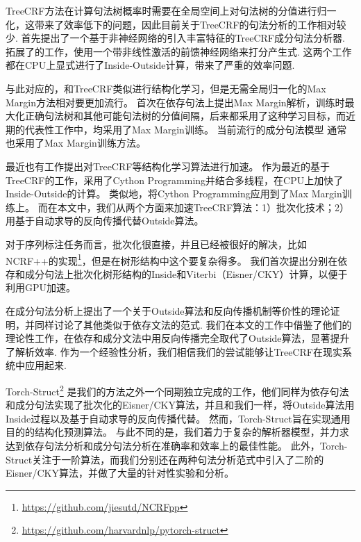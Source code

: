 TreeCRF方法在计算句法树概率时需要在全局空间上对句法树的分值进行归一化，这带来了效率低下的问题，因此目前关于TreeCRF的句法分析的工作相对较少.
\citet{finkel-etal-2008-efficient}首先提出了一个基于非神经网络的引入丰富特征的TreeCRF成分句法分析器.
\citet{durrett-klein-2015-neural}拓展了\citet{finkel-etal-2008-efficient}的工作，使用一个带非线性激活的前馈神经网络来打分产生式.
这两个工作都在CPU上显式进行了Inside-Outside计算，带来了严重的效率问题.

与此对应的，和TreeCRF类似进行结构化学习，但是无需全局归一化的Max Margin方法相对要更加流行。
\citet{taskar-etal-2004-max}首次在依存句法上提出Max Margin解析，训练时最大化正确句法树和其他可能句法树的分值间隔，后来\citet{mcdonald-etal-2005-online,mcdonald-etal-2005-online}都采用了这种学习目标，而近期的代表性工作中，\citet{wang-chang-2016-graph,kiperwasser-goldberg-2016-simple}均采用了Max Margin训练。
当前流行的成分句法模型 \citep{stern-etal-2017-minimal,kitaev-klein-2018-constituency,zhou-zhao-2019-head}通常也采用了Max Margin训练方法。

最近也有工作提出对TreeCRF等结构化学习算法进行加速。
\citet{zhang-etal-2017-dependency-parsing,jiang-etal-2018-supervised,li-etal-2019-semi-supervised}作为最近的基于TreeCRF的工作，采用了Cython Programming并结合多线程，在CPU上加快了Inside-Outside的计算。
类似地，\citet{kitaev-klein-2018-constituency}将Cython Programming应用到了Max Margin训练上。
而在本文中，我们从两个方面来加速TreeCRF算法：1）批次化技术；2）用基于自动求导的反向传播代替Outside算法。

对于序列标注任务而言，批次化很直接，并且已经被很好的解决，比如NCRF++的实现\footnote{\url{https://github.com/jiesutd/NCRFpp}}，但是在树形结构中这个要复杂得多。
我们首次提出分别在依存和成分句法上批次化树形结构的Inside和Viterbi（Eisner/CKY）计算，以便于利用GPU加速。

\citet{eisner-2016-inside}在成分句法分析上提出了一个关于Outside算法和反向传播机制等价性的理论证明，并同样讨论了其他类似于依存文法的范式.
我们在本文的工作中借鉴了他们的理论性工作，在依存和成分文法中用反向传播完全取代了Outside算法，显著提升了解析效率.
作为一个经验性分析，我们相信我们的尝试能够让TreeCRF在现实系统中应用起来.

Torch-Struct\footnote{\url{https://github.com/harvardnlp/pytorch-struct}} \citep{rush-2020-torch}是我们的方法之外一个同期独立完成的工作，他们同样为依存句法和成分句法实现了批次化的Eisner/CKY算法，并且和我们一样，将Outside算法用Inside过程以及基于自动求导的反向传播代替。
然而，Torch-Struct旨在实现通用目的的结构化预测算法。
与此不同的是，我们着力于复杂的解析器模型，并力求达到依存句法分析和成分句法分析在准确率和效率上的最佳性能。
此外，Torch-Struct关注于一阶算法，而我们分别还在两种句法分析范式中引入了二阶的Eisner/CKY算法，并做了大量的针对性实验和分析。

